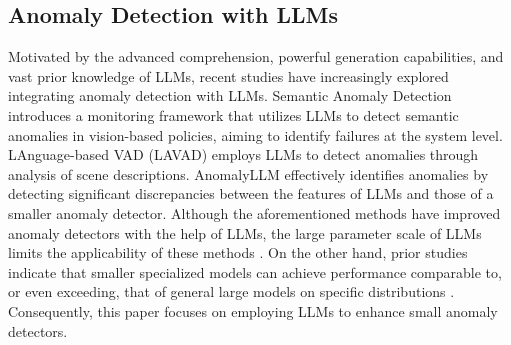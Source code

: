 \subsection{Anomaly Detection with LLMs}
Motivated by the advanced comprehension, powerful generation capabilities, and vast prior knowledge of LLMs, recent studies have increasingly explored integrating anomaly detection with LLMs.
Semantic Anomaly Detection \cite{elhafsi2023semantic} introduces a monitoring framework that utilizes LLMs to detect semantic anomalies in vision-based policies, aiming to identify failures at the system level.
LAnguage-based VAD (LAVAD) \cite{zanella2024harnessing} employs LLMs to detect anomalies through analysis of scene descriptions. 
AnomalyLLM \cite{liu2024large} effectively identifies anomalies by detecting significant discrepancies between the features of LLMs and those of a smaller anomaly detector. Although the aforementioned methods have improved anomaly detectors with the help of LLMs, the large parameter scale of LLMs limits the applicability of these methods \cite{patrikar2022anomaly,yu2022edge,ngo2020adaptive}.
On the other hand, prior studies indicate that smaller specialized models can achieve performance comparable to, or even exceeding, that of general large models on specific distributions \cite{chen2024data,chen2024improving}. Consequently, this paper focuses on employing LLMs to enhance small anomaly detectors.


